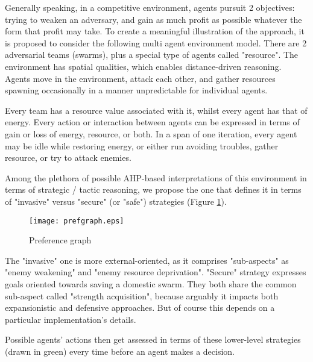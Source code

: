 Generally speaking, in a competitive environment, agents pursuit 2 objectives: trying to weaken an adversary, and gain
as much profit as possible whatever the form that profit may take. To create a meaningful illustration of the approach,
it is proposed to consider the following multi agent environment model. There are 2 adversarial teams (swarms), plus a
special type of agents called "resource". The environment has spatial qualities, which enables distance-driven
reasoning. Agents move in the environment, attack each other, and gather resources spawning occasionally in a manner
unpredictable for individual agents.

Every team has a resource value associated with it, whilst every agent has that of energy. Every action or interaction
between agents can be expressed in terms of gain or loss of energy, resource, or both. In a span of one iteration, every
agent may be idle while restoring energy, or either run avoiding troubles, gather resource, or try to attack enemies.

Among the plethora of possible AHP-based interpretations of this environment in terms of strategic / tactic reasoning,
we propose the one that defines it in terms of "invasive" versus "secure" (or "safe") strategies (Figure
\ref{fig:df-models}).

\begin{figure}[hbt!]
    \centering
    \texttt{[image: prefgraph.eps]}

    \caption{\small Preference graph}
    \label{fig:df-models}
\end{figure}

The "invasive" one is more external-oriented, as it comprises "sub-aspects" as "enemy weakening" and "enemy resource
deprivation". "Secure" strategy expresses goals oriented towards saving a domestic swarm. They both share the common
sub-aspect called "strength acquisition", because arguably it impacts both expansionistic and defensive approaches. But
of course this depends on a particular implementation's details.

Possible agents' actions then get assessed in terms of these lower-level strategies (drawn in green) every time before
an agent makes a decision.